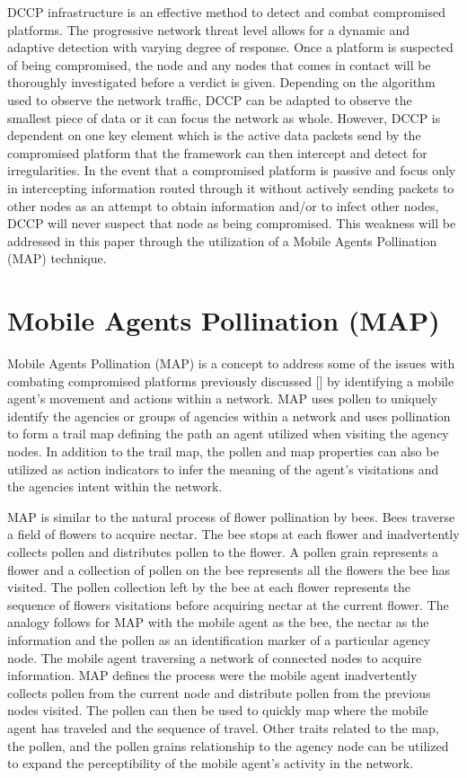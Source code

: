 \documentclass{acm_proc_article-sp}
\begin{document}
DCCP infrastructure is an effective method to detect and combat compromised platforms. The progressive network threat level allows for a dynamic and adaptive detection with varying degree of response. Once a platform is suspected of being compromised, the node and any nodes that comes in contact will be thoroughly investigated before a verdict is given. Depending on the algorithm used to observe the network traffic, DCCP can be adapted to observe the smallest piece of data or it can focus the network as whole. However, DCCP is dependent on one key element which is the active data packets send by the compromised platform that the framework can then intercept and detect for irregularities. In the event that a compromised platform is passive and focus only in intercepting information routed through it without actively sending packets to other nodes as an attempt to obtain information and/or to infect other nodes, DCCP will never suspect that node as being compromised. This weakness will be addressed in this paper through the utilization of a Mobile Agents Pollination (MAP) technique. 

\section{Mobile Agents Pollination (MAP)}
Mobile Agents Pollination (MAP) is a concept to address some of the issues with combating compromised platforms previously discussed [] by identifying a mobile agent’s movement and actions within a network. MAP uses pollen to uniquely identify the agencies or groups of agencies within a network and uses pollination to form a trail map defining the path an agent utilized when visiting the agency nodes. In addition to the trail map, the pollen and map properties can also be utilized as action indicators to infer the meaning of the agent’s visitations and the agencies intent within the network.

MAP is similar to the natural process of flower pollination by bees. Bees traverse a field of flowers to acquire nectar. The bee stops at each flower and inadvertently collects pollen and distributes pollen to the flower. A pollen grain represents a flower and a collection of pollen on the bee represents all the flowers the bee has visited. The pollen collection left by the bee at each flower represents the sequence of flowers visitations before acquiring nectar at the current flower. The analogy follows for MAP with the mobile agent as the bee, the nectar as the information and the pollen as an identification marker of a particular agency node.  The mobile agent traversing a network of connected nodes to acquire information.  MAP defines the process were the mobile agent inadvertently collects pollen from the current node and distribute pollen from the previous nodes visited. The pollen can then be used to quickly map where the mobile agent has traveled and the sequence of travel. Other traits related to the map, the pollen, and the pollen grains relationship to the agency node can be utilized to expand the perceptibility of the mobile agent’s activity in the network.    
\end{document}
